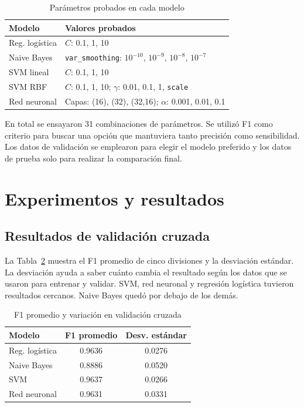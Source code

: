 \documentclass[conference]{IEEEtran}
\begin{document}
\begin{table}[!t]
\centering
\caption{Parámetros probados en cada modelo}
\label{tab:param}
\footnotesize
\begin{tabular}{p{.28\linewidth}p{.64\linewidth}}
\toprule
Modelo & Valores probados\\\midrule
Reg. logística & $C$: 0.1, 1, 10\\
Naive Bayes & \texttt{var\_smoothing}: $10^{-10}$, $10^{-9}$, $10^{-8}$, $10^{-7}$\\
SVM lineal & $C$: 0.1, 1, 10\\
SVM RBF & $C$: 0.1, 1, 10; $\gamma$: 0.01, 0.1, 1, \texttt{scale}\\
Red neuronal & Capas: (16), (32), (32,16); $\alpha$: 0.001, 0.01, 0.1\\
\bottomrule
\end{tabular}
\end{table}

En total se ensayaron 31 combinaciones de parámetros. Se utilizó F1 como criterio para buscar una opción que mantuviera tanto precisión como sensibilidad. Los datos de validación se emplearon para elegir el modelo preferido y los datos de prueba solo para realizar la comparación final.

\section{Experimentos y resultados}
\subsection{Resultados de validación cruzada}
La Tabla~\ref{tab:cv} muestra el F1 promedio de cinco divisiones y la desviación estándar. La desviación ayuda a saber cuánto cambia el resultado según los datos que se usaron para entrenar y validar. SVM, red neuronal y regresión logística tuvieron resultados cercanos. Naive Bayes quedó por debajo de los demás.

\begin{table}[!t]
\centering
\caption{F1 promedio y variación en validación cruzada}
\label{tab:cv}
\footnotesize
\begin{tabular}{lcc}
\toprule Modelo & F1 promedio & Desv. estándar\\\midrule
Reg. logística & 0.9636 & 0.0276\\
Naive Bayes & 0.8886 & 0.0520\\
SVM & 0.9637 & 0.0266\\
Red neuronal & 0.9631 & 0.0331\\
\bottomrule
\end{tabular}
\end{table}
\end{document}
